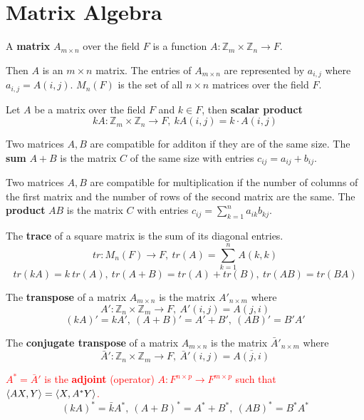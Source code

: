 \chapter{Matrix Algebra}
\begin{definition}
	A \textbf{matrix} $A_{m \times n}$ over the field $F$ is a function $A : \mathbb{Z}_m \times \mathbb{Z}_n \to F$.
\end{definition}
	Then $A$ is an $m \times n$ matrix.
	The entries of $A_{m \times n}$ are represented by $a_{i,j}$ where $a_{i,j} = A(i,j)$.
	$M_n(F)$ is the set of all $n \times n$ matrices over the field $F$.

\begin{definition}
	Let $A$ be a matrix over the field $F$ and $k \in F$, then \textbf{scalar product}
	$$kA : \mathbb{Z}_m \times \mathbb{Z}_n \to F,\ kA(i,j) = k \cdot A(i,j)$$
\end{definition}

\begin{definition}
	Two matrices $A,B$ are compatible for additon if they are of the same size.
	The \textbf{sum} $A+B$ is the matrix $C$ of the same size with entries $c_{ij} = a_{ij} + b_{ij}$.
\end{definition}

\begin{definition}
	Two matrices $A,B$ are compatible for multiplication if the number of columns of the first matrix and the number of rows of the second matrix are the same.
	The \textbf{product} $AB$ is the matrix $C$ with entries
	$ c_{ij} = \sum_{k=1}^n a_{ik}b_{kj}$.
\end{definition}
\begin{definition}
	The \textbf{trace} of a square matrix is the sum of its diagonal entries.
	$$ tr : M_n(F) \to F,\ tr(A) = \sum_{k=1}^n A(k,k) $$
	$$tr(kA) = k\ tr(A),\ tr(A+B) = tr(A) + tr(B),\ tr(AB) = tr(BA)$$
\end{definition}

\begin{definition}
	The \textbf{transpose} of a matrix $A_{m \times n}$ is the matrix $A'_{n \times m}$ where
		$$A' : \mathbb{Z}_n \times \mathbb{Z}_m \to F,\ A'(i,j) = A(j,i)$$
		$$(kA)'=kA',\ (A+B)'=A'+B',\ (AB)'=B'A'$$
\end{definition}

\begin{definition}
	The \textbf{conjugate transpose} of a matrix $A_{m \times n}$ is the matrix $\bar{A}'_{n \times m}$ where
		$$\bar{A}' : \mathbb{Z}_n \times \mathbb{Z}_m \to F,\ \bar{A}'(i,j) = \overline{A(j,i)}$$
\end{definition}
	\textcolor{red}{$A^\ast = \bar{A}'$ is the \textbf{adjoint} (operator) $A : F^{n \times p} \to F^{m \times p}$ such that $\left\langle AX,Y \right\rangle = \left\langle X,A^\ast Y \right\rangle$.}
	$$(kA)^\ast = \bar{k}A^\ast,\ (A+B)^\ast = A^\ast + B^\ast,\ (AB)^\ast = B^\ast A^\ast$$

